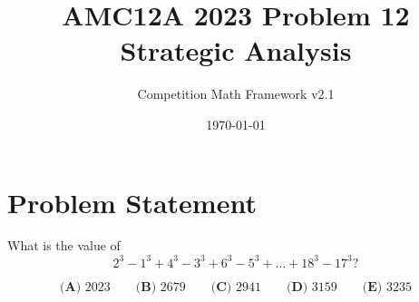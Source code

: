 \documentclass[12pt]{article}
\begin{document}
\title{AMC12A 2023 Problem 12\\Strategic Analysis}
\author{Competition Math Framework v2.1}
\date{\today}
\maketitle

\section*{Problem Statement}

What is the value of
$$2^3 - 1^3 + 4^3 - 3^3 + 6^3 - 5^3 + \dots + 18^3 - 17^3?$$

$$\textbf{(A) } 2023 \qquad\textbf{(B) } 2679 \qquad\textbf{(C) } 2941 \qquad\textbf{(D) } 3159 \qquad\textbf{(E) } 3235$$
\end{document}
